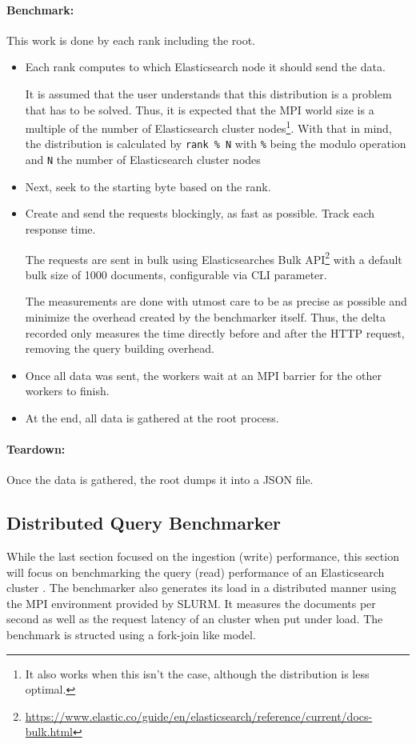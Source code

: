 \paragraph{Benchmark:} This work is done by each rank including the root.
\begin{itemize}
  \item Each rank computes to which Elasticsearch node it should send the data. 

    It is assumed that the user understands that this distribution is a problem that has to be solved. Thus, it is expected that the \ac{MPI} world size is a multiple of the number of Elasticsearch cluster nodes\footnote{It also works when this isn't the case, although the distribution is less optimal.}. With that in mind, the distribution is calculated by \texttt{rank \% N} with \texttt{\%} being the modulo operation and \texttt{N} the number of Elasticsearch cluster nodes

  \item Next, seek to the starting byte based on the rank.
  \item Create and send the requests blockingly, as fast as possible. Track each response time.

    The requests are sent in bulk using Elasticsearches Bulk API\footnote{\url{https://www.elastic.co/guide/en/elasticsearch/reference/current/docs-bulk.html}} with a default bulk size of 1000 documents, configurable via CLI parameter.

    The measurements are done with utmost care to be as precise as possible and minimize the overhead created by the benchmarker itself. Thus, the delta recorded only measures the time directly before and after the HTTP request, removing the query building overhead.
  \item Once all data was sent, the workers wait at an \ac{MPI} barrier for the other workers to finish.
  \item At the end, all data is gathered at the root process.
\end{itemize}

\paragraph{Teardown:}
Once the data is gathered, the root dumps it into a \ac{JSON} file.

\subsection{Distributed Query Benchmarker}
While the last section focused on the ingestion (write) performance, this section will focus on benchmarking the query (read) performance of an Elasticsearch cluster \cite{myquery}. The benchmarker also generates its load in a distributed manner using the \ac{MPI} environment provided by SLURM. It measures the documents per second as well as the request latency of an cluster when put under load. The benchmark is structed using a fork-join like model. 

